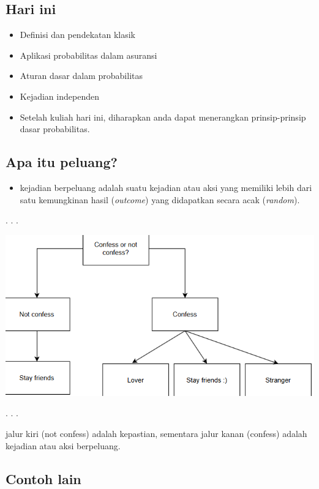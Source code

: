 \documentclass[
  letterpaper,
  DIV=11,
  numbers=noendperiod]{scrartcl}
\providecommand{\tightlist}{%
  \setlength{\itemsep}{0pt}\setlength{\parskip}{0pt}}\usepackage{longtable,booktabs,array}
\begin{document}
\hypertarget{hari-ini}{%
\subsection{Hari ini}\label{hari-ini}}

\begin{itemize}
\item
  Definisi dan pendekatan klasik
\item
  Aplikasi probabilitas dalam asuransi
\item
  Aturan dasar dalam probabilitas
\item
  Kejadian independen
\item
  Setelah kuliah hari ini, diharapkan anda dapat menerangkan
  prinsip-prinsip dasar probabilitas.
\end{itemize}

\hypertarget{apa-itu-peluang}{%
\subsection{Apa itu peluang?}\label{apa-itu-peluang}}

\begin{itemize}
\tightlist
\item
  kejadian berpeluang adalah suatu kejadian atau aksi yang memiliki
  lebih dari satu kemungkinan hasil (\emph{outcome}) yang didapatkan
  secara acak (\emph{random}).
\end{itemize}

. . .

\includegraphics{ea.png}

. . .

jalur kiri (not confess) adalah kepastian, sementara jalur kanan
(confess) adalah kejadian atau aksi berpeluang.

\hypertarget{contoh-lain}{%
\subsection{Contoh lain}\label{contoh-lain}}
\end{document}
